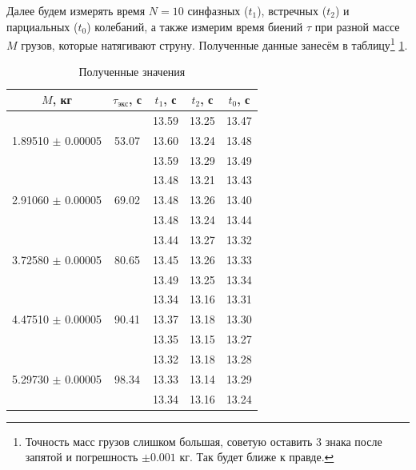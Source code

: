 \documentclass[a4paper,12pt]{article}
\theoremstyle{plain} %
\theoremstyle{definition} %
\theoremstyle{remark} %
\begin{document}
Далее будем измерять время $N=10$ синфазных ($t_1$), встречных ($t_2$) и парциальных ($t_0$) колебаний, а также измерим время биений $\tau$ при разной массе $M$ грузов, которые натягивают струну. Полученные данные занесём в таблицу\footnote{Точность масс грузов слишком большая, советую оставить 3 знака после запятой и погрешность $\pm 0.001$ кг. Так будет ближе к правде.} \ref{my-label}.
\begin{table}[h!]
	\centering
	\caption{Полученные значения}
	\label{my-label}
	\begin{tabular}{|c|c|c|c|c|}
		\hline
		$M$, кг                               & $\tau_{\text{экс}}$, с              & $t_1$, с & $t_2$, с & $t_0$, с \\ \hline
		\multirow{3}{*}{1.89510 $\pm$ 0.00005} & \multirow{3}{*}{53.07} & 13.59    & 13.25    & 13.47    \\ \cline{3-5} 
		&                        & 13.60    & 13.24    & 13.48    \\ \cline{3-5} 
		&                        & 13.59    & 13.29    & 13.49    \\ \hline
		\multirow{3}{*}{2.91060 $\pm$ 0.00005} & \multirow{3}{*}{69.02} & 13.48    & 13.21    & 13.43    \\ \cline{3-5} 
		&                        & 13.48    & 13.26    & 13.40    \\ \cline{3-5} 
		&                        & 13.48    & 13.24    & 13.44    \\ \hline
		\multirow{3}{*}{3.72580 $\pm$ 0.00005} & \multirow{3}{*}{80.65} & 13.44    & 13.27    & 13.32    \\ \cline{3-5} 
		&                        & 13.45    & 13.26    & 13.33    \\ \cline{3-5} 
		&                        & 13.49    & 13.25    & 13.34    \\ \hline
		\multirow{3}{*}{4.47510 $\pm$ 0.00005} & \multirow{3}{*}{90.41} & 13.34    & 13.16    & 13.31    \\ \cline{3-5} 
		&                        & 13.37    & 13.18    & 13.30    \\ \cline{3-5} 
		&                        & 13.35    & 13.15    & 13.27    \\ \hline
		\multirow{3}{*}{5.29730 $\pm$ 0.00005} & \multirow{3}{*}{98.34} & 13.32    & 13.18    & 13.28    \\ \cline{3-5} 
		&                        & 13.33    & 13.14    & 13.29    \\ \cline{3-5} 
		&                        & 13.34    & 13.16    & 13.24    \\ \hline
	\end{tabular}
\end{table}
\end{document}

